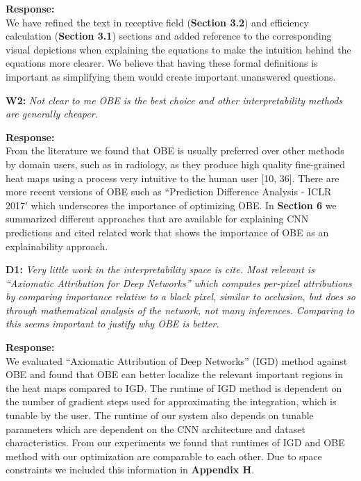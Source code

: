 \documentclass[preprint]{vldb}
\begin{document}
\vspace{2mm}
\noindent \textbf{Response:}\\
We have refined the text in receptive field (\textbf{Section 3.2}) and efficiency calculation (\textbf{Section 3.1}) sections and added reference to the corresponding visual depictions when explaining the equations to make the intuition behind the equations more clearer.
We believe that having these formal definitions is important as simplifying
them would create important unanswered questions.

\vspace{2mm}
\noindent \textbf{W2:} \textit{Not clear to me OBE is the best choice and other interpretability methods are generally cheaper.}

\vspace{2mm}
\noindent \textbf{Response:} \\
From the literature we found that OBE is usually preferred over other methods by domain users, such as in radiology, as they produce high quality fine-grained heat maps using a process very intuitive to the human user [10, 36].
There are more recent versions of OBE such as ``Prediction Difference Analysis - ICLR 2017' which underscores the importance of optimizing OBE.
In \textbf{Section 6} we summarized different approaches that are available for explaining CNN predictions and cited related work that shows the importance of OBE as an explainability approach.


\vspace{2mm}
\noindent \textbf{D1:} \textit{Very little work in the interpretability space is cite. Most relevant is ``Axiomatic Attribution for Deep Networks'' which computes per-pixel attributions by comparing importance relative to a black pixel, similar to occlusion, but does so through mathematical analysis of the network, not many inferences. Comparing to this seems important to justify why OBE is better.}

\vspace{2mm}
\noindent \textbf{Response:} \\
We evaluated ``Axiomatic Attribution of Deep Networks'' (IGD) method against OBE and found that OBE can better localize the relevant important regions in the heat maps compared to IGD.
The runtime of IGD method is dependent on the number of gradient steps used for approximating the integration, which is tunable by the user. 
The runtime of our system also depends on tunable parameters which are dependent on the CNN architecture and dataset characteristics.
From our experiments we found that runtimes of IGD and OBE method with our optimization are comparable to each other.
Due to space constraints we included this information in \textbf{Appendix H}.
\end{document}
